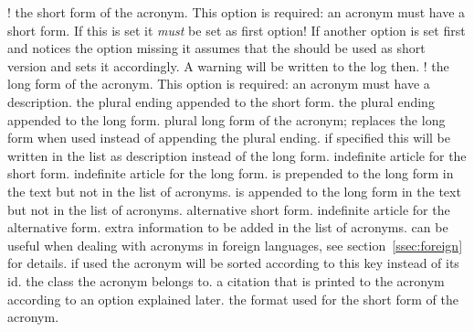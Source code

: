 \documentclass[load-preamble+,scrartcl={DIV10}]{cnltx-doc}
\begin{document}
\begin{options}
  \Default!
    the short form of the acronym.  This option is required: an acronym must
    have a short form.  If this is set it \emph{must} be set as first option!
    If another option is set first and notices the  option
    missing it assumes that the  should be used as short version and
    sets it accordingly.  A warning will be written to the log then.
  \Default!
    the long form of the acronym.  This option is required: an acronym must
    have a description.
    the plural ending appended to the short form.
    the plural ending appended to the long form.
      plural long form of the acronym; replaces the long form when used
      instead of appending the plural ending.
    if specified this will be written in the list as
    description instead of the long form.
    indefinite article for the short form.
    indefinite article for the long form.
     is prepended to the long form in the text
    but not in the list of acronyms.
     is appended to the long form in the text but
    not in the list of acronyms.
    alternative short form.
    indefinite article for the alternative form.
    extra information to be added in the list of acronyms.
    can be useful when dealing with acronyms in foreign
    languages, see section~\ref{ssec:foreign} for details.
    if used the acronym will be sorted according to this key instead of its
    \acs{id}.
    the class the acronym belongs to.
    a citation that is printed to the acronym according to an option explained
    later.
    the format used for the short form of the acronym.

\end{options}
\end{document}
